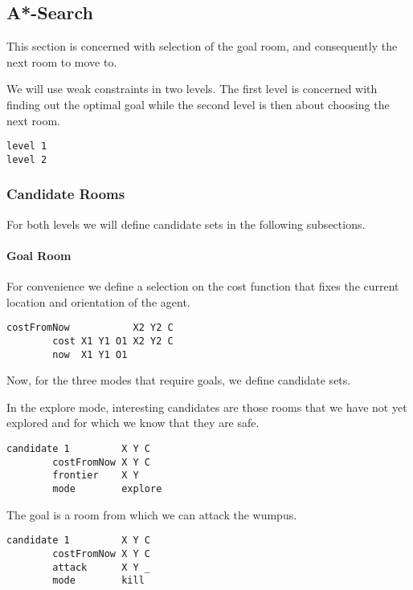 \hypertarget{a-search}{%
\subsection{A*-Search}\label{a-search}}

This section is concerned with selection of the goal room, and
consequently the next room to move to.

We will use weak constraints in two levels. The first level is concerned
with finding out the optimal goal while the second level is then about
choosing the next room.

\begin{verbatim}
level 1
level 2
\end{verbatim}

\hypertarget{candidate-rooms}{%
\subsubsection{Candidate Rooms}\label{candidate-rooms}}

For both levels we will define candidate sets in the following
subsections.

\hypertarget{goal-room}{%
\paragraph{Goal Room}\label{goal-room}}

For convenience we define a selection on the cost function that fixes
the current location and orientation of the agent.

\begin{verbatim}
costFromNow           X2 Y2 C
        cost X1 Y1 O1 X2 Y2 C
        now  X1 Y1 O1
\end{verbatim}

Now, for the three modes that require goals, we define candidate sets.

In the explore mode, interesting candidates are those rooms that we have
not yet explored and for which we know that they are safe.

\begin{verbatim}
candidate 1         X Y C
        costFromNow X Y C
        frontier    X Y
        mode        explore
\end{verbatim}

The goal is a room from which we can attack the wumpus.

\begin{verbatim}
candidate 1         X Y C
        costFromNow X Y C
        attack      X Y _
        mode        kill
\end{verbatim}

